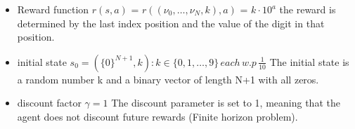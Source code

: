 \documentclass{assignmeownt}
\begin{document}
\begin{enumerate}
\begin{itemize}
\item Reward function $r(s, a)$ = $r((\nu_0, \dots, \nu_{N}, k), a)$ = $ k \cdot{10^a} $
\newline
the reward is determined by the last index position and the value of the digit in that position.

\item initial state $s_0 = (\{0\}^{N+1}, k): k \in \{0, 1, \dots, 9\} \, each \, w.p \, \frac{1}{10}$
\newline
The initial state is a random number k and a binary vector of length N+1 with all zeros.
\item discount factor $\gamma = 1$
\newline
The discount parameter is set to 1, meaning that the agent does not discount future rewards (Finite horizon problem).

\end{itemize} %


\end{enumerate}
\end{document}
